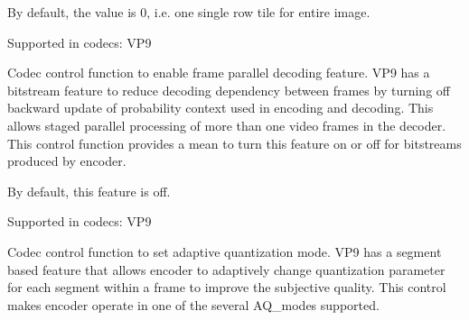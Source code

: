 \begin{Desc}
\begin{description}
By default, the value is 0, i.\+e. one single row tile for entire image.

Supported in codecs\+: V\+P9 \item[{\em 
V\+P9\+E\+\_\+\+S\+E\+T\+\_\+\+F\+R\+A\+M\+E\+\_\+\+P\+A\+R\+A\+L\+L\+E\+L\+\_\+\+D\+E\+C\+O\+D\+I\+NG\hypertarget{group__vp8__encoder_gga6deae3d561c838952552c3d3756322eca7e61bfc05a2eb5a53d8f2091ebc5d40e}{}\label{group__vp8__encoder_gga6deae3d561c838952552c3d3756322eca7e61bfc05a2eb5a53d8f2091ebc5d40e}
}]Codec control function to enable frame parallel decoding feature. V\+P9 has a bitstream feature to reduce decoding dependency between frames by turning off backward update of probability context used in encoding and decoding. This allows staged parallel processing of more than one video frames in the decoder. This control function provides a mean to turn this feature on or off for bitstreams produced by encoder.

By default, this feature is off.

Supported in codecs\+: V\+P9 \item[{\em 
V\+P9\+E\+\_\+\+S\+E\+T\+\_\+\+A\+Q\+\_\+\+M\+O\+DE\hypertarget{group__vp8__encoder_gga6deae3d561c838952552c3d3756322eca375af288e2d7fa169cbfef4ba586c1d2}{}\label{group__vp8__encoder_gga6deae3d561c838952552c3d3756322eca375af288e2d7fa169cbfef4ba586c1d2}
}]Codec control function to set adaptive quantization mode. V\+P9 has a segment based feature that allows encoder to adaptively change quantization parameter for each segment within a frame to improve the subjective quality. This control makes encoder operate in one of the several A\+Q\+\_\+modes supported.


\end{description}
\end{Desc}
